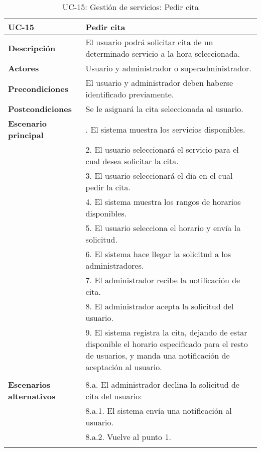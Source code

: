 \begin{table}[H]
  \begin{center}
    \begin{tabularx}{16.4cm}{|l|X|}
      \hline
      \textbf{UC-15} & \textbf{Pedir cita}\\
      \hline
      \textbf{Descripción} & El usuario podrá solicitar cita de un determinado servicio a la hora seleccionada.\\
      \hline
      \textbf{Actores} & Usuario y administrador o superadministrador.\\
      \hline
      \textbf{Precondiciones} & El usuario y administrador deben haberse identificado previamente.\\
      \hline
      \textbf{Postcondiciones} & Se le asignará la cita seleccionada al usuario.\\
      \hline
      \textbf{Escenario principal} & \smallskip 1. El sistema muestra los servicios disponibles.\\
      & 2. El usuario seleccionará el servicio para el cual desea solicitar la cita.\\
      & 3. El usuario seleccionará el día en el cual pedir la cita.\\
      & 4. El sistema muestra los rangos de horarios disponibles.\\
      & 5. El usuario selecciona el horario y envía la solicitud.\\
      & 6. El sistema hace llegar la solicitud a los administradores.\\
      & 7. El administrador recibe la notificación de cita.\\
      & 8. El administrador acepta la solicitud del usuario.\\
      & 9. El sistema registra la cita, dejando de estar disponible el horario especificado para el resto de usuarios, y manda una notificación de aceptación al usuario.\\
      & \\
      \hline
      \textbf{Escenarios alternativos} & \smallskip 8.a. El administrador declina la solicitud de cita del usuario:\\
      & \hspace{0.3cm} 8.a.1. El sistema envía una notificación al usuario.\\
      & \hspace{0.3cm} 8.a.2. Vuelve al punto 1.\\
      & \\
      \hline
    \end{tabularx}
    \caption{UC-15: Gestión de servicios: Pedir cita}
  \end{center}
\end{table}


